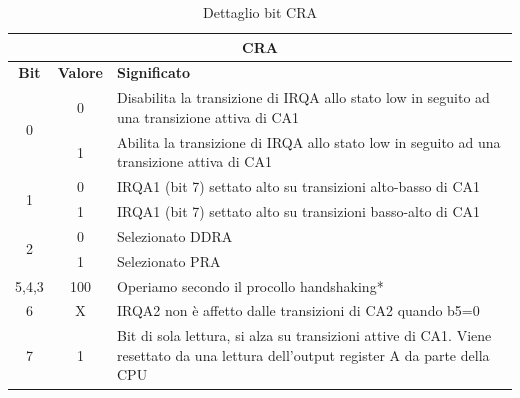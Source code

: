 \begin{table}[H]
    \centering
    \begin{tabular}{|c|c|p{9cm}|}
    \hline
    \multicolumn{3}{|c|}{\textbf{CRA}} \\
    \hline
    \textbf{Bit} & \textbf{Valore} & \textbf{Significato} \\
    \hline
    \multirow{2}{*}{0} & 0 & Disabilita la transizione di IRQA allo stato low in seguito ad una transizione attiva di CA1 \\
                    & 1 &  Abilita la transizione di IRQA allo stato low in seguito ad una transizione attiva di CA1 \\
                    \hline
    \multirow{2}{*}{1} & 0 & IRQA1 (bit 7) settato alto su transizioni alto-basso di CA1 \\
                    & 1 & IRQA1 (bit 7) settato alto su transizioni basso-alto di CA1 \\
                    \hline
                    \multirow{2}{*}{2} & 0 & Selezionato DDRA \\
                    & 1 & Selezionato PRA \\
    \hline
    5,4,3 & 100 & Operiamo secondo il procollo handshaking* \\
                    
    \hline
    6 & X & IRQA2 non è affetto dalle transizioni di CA2 quando b5=0\\
    \hline
    7 & 1 & Bit di sola lettura, si alza su transizioni attive di CA1. Viene resettato da una lettura dell'output register A da parte della CPU \\
    \hline
\end{tabular}
    \caption{Dettaglio bit CRA}
    \label{Tab:CRA}
\end{table}

